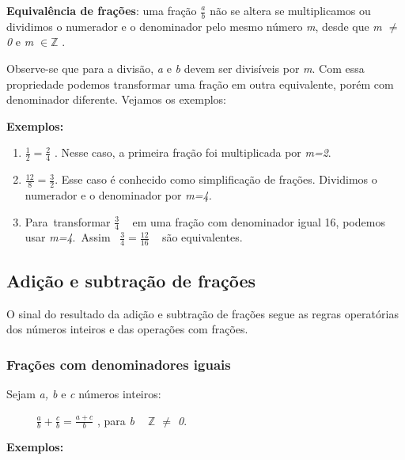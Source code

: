\textbf{Equivalência de frações}: uma fração  \( \frac{a}{b} \)   não se altera se multiplicamos ou dividimos o numerador e o denominador pelo mesmo número \textit{m}, desde que\textit{ m $ \neq $  0 }e\textit{ m  \(\in \mathbb{Z} \) }.

 \quad {}

Observe-se que para a divisão, \textit{a} e \textit{b} devem ser divisíveis por \textit{m}. Com essa propriedade podemos transformar uma fração em outra equivalente, porém com denominador diferente. Vejamos os exemplos:

\textbf{Exemplos:}

\begin{enumerate}
	\item  \( \frac{1}{2}=\frac{2}{4} \)  . Nesse caso, a primeira fração foi multiplicada por \textit{m=2}.

	\item   \( \frac{12}{8}=\frac{3}{2} \). Esse caso é conhecido como simplificação de frações. Dividimos o numerador e o denominador por \textit{m=4.}

	\item Para~transformar   \( \frac{3}{4} \) ~ em uma fração com denominador igual 16, podemos usar \textit{m=4}.~Assim~   \( \frac{3}{4}=\frac{12}{16} \) ~ são equivalentes.
\end{enumerate}

\subsection{Adição e subtração de frações }

\quad O sinal do resultado da adição e subtração de frações segue as regras operatórias dos números inteiros e das operações com frações.

\quad 
\subsubsection{Frações com denominadores iguais}

Sejam \textit{a, b} e \textit{c} números inteiros: 

\textbf{\quad ~~~~  \( \frac{a}{b}+\frac{c}{b}=\frac{a+c}{b} \) \quad }{\fontsize{16pt}{19.2pt}\selectfont \quad , para \textit{b ~  \( \mathbb{Z} \)  $ \neq $  0}.}

\textbf{Exemplos: }


